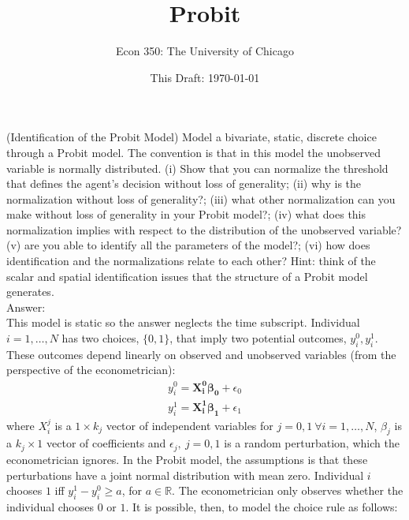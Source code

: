 



\title{Probit}
\author{Econ 350: The University of Chicago}
\date{This Draft: \today}
\maketitle

\setcounter{section}{1}

\begin{exercise} (Identification of the Probit Model) \label{exercise:idenprobit}
Model a bivariate, static, discrete choice through a Probit model. The convention is that in this model the unobserved variable is normally distributed. (i) Show that you can normalize the threshold that defines the agent's decision without loss of generality;  (ii) why is the normalization without loss of generality?; (iii) what other normalization can you make without loss of generality in your Probit model?; (iv) what does this normalization implies with respect to the distribution of the unobserved variable? (v) are you able to identify all the parameters of the model?; (vi) how does identification and the normalizations relate to each other? Hint: think of the scalar and spatial identification issues that the structure of a Probit model generates.\\
\noindent Answer:\\
\noindent This model is static so the answer neglects the time subscript. Individual $i = 1, \ldots, N$ has two choices, $\{0,1\}$, that imply two potential outcomes, $y_{i}^{0}, y_{i}^{1}$. These outcomes depend linearly on observed and unobserved variables (from the perspective of the econometrician):
\begin{eqnarray}
y_{i}^{0} = \mathbf{X_{i}^0 \beta_{0}} + \epsilon_{0} \\ \nonumber
y_{i}^{1} = \mathbf{X_{i}^1 \beta_{1}} + \epsilon_{1}
\end{eqnarray} 
\noindent where $X_{i}^{j}$ is a $1 \times k_{j}$ vector of independent variables for $j=0,1 \ \forall i = 1, \ldots, N$, $\beta_{j}$ is a $ k_{j} \times 1$ vector of coefficients and $\epsilon_{j}, \ j=0,1$ is a random perturbation, which the econometrician ignores. In the Probit model, the assumptions is that these perturbations have a joint normal distribution with mean zero. Individual $i$ chooses $1$ iff $y_{i}^{1} - y_{i}^{0} \geq a$, for $a \in \mathbb{R}$. The econometrician only observes whether the individual chooses $0$ or $1$. It is possible, then, to model the choice rule as follows:

\end{exercise}
